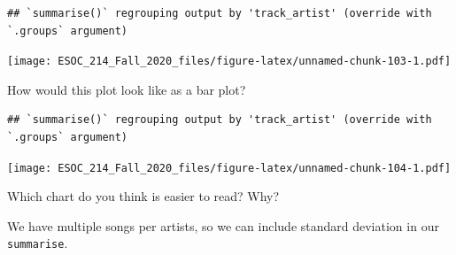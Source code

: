 \documentclass[
]{book}
\newenvironment{Shaded}{\begin{snugshade}}{\end{snugshade}}
\newcommand{\DataTypeTok}[1]{\textcolor[rgb]{0.13,0.29,0.53}{#1}}
\newcommand{\KeywordTok}[1]{\textcolor[rgb]{0.13,0.29,0.53}{\textbf{#1}}}
\newcommand{\NormalTok}[1]{#1}
\newcommand{\OperatorTok}[1]{\textcolor[rgb]{0.81,0.36,0.00}{\textbf{#1}}}
\newcommand{\StringTok}[1]{\textcolor[rgb]{0.31,0.60,0.02}{#1}}
\begin{document}
\begin{verbatim}
## `summarise()` regrouping output by 'track_artist' (override with `.groups` argument)
\end{verbatim}

\texttt{[image: ESOC\_214\_Fall\_2020\_files/figure-latex/unnamed-chunk-103-1.pdf]}

How would this plot look like as a bar plot?

\begin{Shaded}
\end{Shaded}

\begin{verbatim}
## `summarise()` regrouping output by 'track_artist' (override with `.groups` argument)
\end{verbatim}

\texttt{[image: ESOC\_214\_Fall\_2020\_files/figure-latex/unnamed-chunk-104-1.pdf]}

Which chart do you think is easier to read? Why?

We have multiple songs per artists, so we can include standard deviation in our \texttt{summarise}.

\begin{Shaded}
\end{Shaded}
\end{document}
